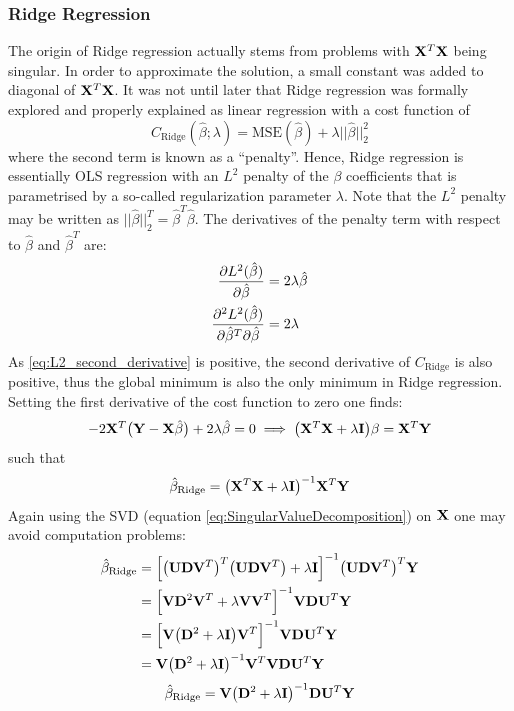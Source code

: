 \documentclass[nofootinbib,reprint,english]{revtex4-1}
\newcommand{\Y}{\vb{Y}}
\newcommand{\X}{\vb{X}}
\newcommand{\betahat}{\hat{\beta}}
\begin{document}
\subsubsection{Ridge Regression}
The origin of Ridge regression actually stems from problems with \(\X^T\X\) being singular. In order to approximate the solution, a small constant was added to diagonal of \(\X^T\X\). It was not until later that Ridge regression was formally explored and properly explained as linear regression with a cost function of
\begin{equation}\label{eq:Ridge_cost}
C_\text{Ridge}(\betahat;\lambda)=\text{MSE}(\betahat)+\lambda||\betahat||_2^2
\end{equation}
where the second term is known as a ``penalty''. Hence, Ridge regression is essentially OLS regression with an \(L^2\) penalty of the \(\beta\) coefficients that is parametrised by a so-called regularization parameter \(\lambda\). Note that the \(L^2\) penalty may be written as \(||\betahat||_2^T=\betahat^T\betahat\). The derivatives of the penalty term with respect to \(\betahat\) and \(\betahat^T\) are:
\begin{subequations}
\begin{align}
\pdv{L^2(\betahat)}{\betahat}&=2\lambda\betahat\label{eq:L2_first_derivative}\\
\pdv{L^2(\betahat)}{\betahat^T}{\betahat}&=2\lambda\label{eq:L2_second_derivative}
\end{align}
\end{subequations}
As \eqref{eq:L2_second_derivative} is positive, the second derivative of \(C_\text{Ridge}\) is also positive, thus the global minimum is also the only minimum in Ridge regression. Setting the first derivative of the cost function to zero one finds:
\[-2\X^T\big(\Y-\X\betahat\big)+2\lambda\betahat=0\implies \big(\X^T\X+\lambda\vb{I}\big)\beta=\X^T\Y\]
such that
\begin{equation}\label{eq:Ridge_solution}
\betahat_\text{Ridge}=\big(\X^T\X+\lambda\vb{I}\big)^{-1}\X^T\Y
\end{equation}
Again using the SVD (equation \eqref{eq:SingularValueDecomposition}) on \(\X\) one may avoid computation problems:
\begin{align*}
\betahat_\text{Ridge}&=\Big[\big(\vb{U}\vb{D}\vb{V}^T\big)^T\big(\vb{U}\vb{D}\vb{V}^T\big)+\lambda\vb{I}\Big]^{-1}\big(\vb{U}\vb{D}\vb{V}^T\big)^T\Y\\
&=\Big[\vb{V}\vb{D}^2\vb{V}^T+\lambda\vb{V}\vb{V}^T\Big]^{-1}\vb{V}\vb{D}\vb{U}^T\vb{Y}\\
&=\Big[\vb{V}\big(\vb{D}^2+\lambda\vb{I}\big)\vb{V}^T\Big]^{-1}\vb{V}\vb{D}\vb{U}^T\vb{Y}\\
&=\vb{V}\big(\vb{D}^2+\lambda\vb{I}\big)^{-1}\vb{V}^T\vb{V}\vb{D}\vb{U}^T\vb{Y}
\end{align*}
\begin{equation}\label{eq:Ridge_solution_SVD}
\betahat_\text{Ridge}=\vb{V}\big(\vb{D}^2+\lambda\vb{I}\big)^{-1}\vb{D}\vb{U}^T\vb{Y}
\end{equation}
\end{document}
